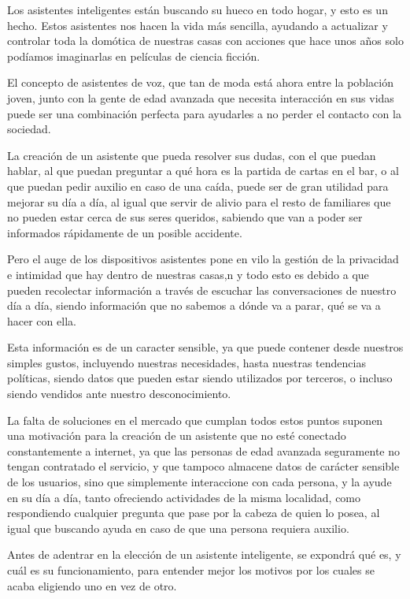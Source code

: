 Los asistentes inteligentes están buscando su hueco en todo hogar, y esto es un hecho.
Estos asistentes nos hacen la vida más sencilla, ayudando a actualizar y controlar toda la domótica de nuestras casas con acciones que hace unos años solo podíamos imaginarlas en películas de ciencia ficción.

El concepto de asistentes de voz, que tan de moda está ahora entre la población joven, junto con la gente de edad avanzada que necesita interacción en sus vidas puede ser una combinación perfecta para ayudarles a no perder el contacto con la sociedad.

La creación de un asistente que pueda resolver sus dudas, con el que puedan hablar, al que puedan preguntar a qué hora es la partida de cartas en el bar, o al que puedan pedir auxilio en caso de una caída, puede ser de gran utilidad para mejorar su día a día, al igual que servir de alivio para el resto de familiares que no pueden estar cerca de sus seres queridos, sabiendo que van a poder ser informados rápidamente de un posible accidente.

Pero el auge de los dispositivos asistentes pone en vilo la gestión de la privacidad e intimidad que hay dentro de nuestras casas,n y todo esto es debido a que pueden recolectar información a través de escuchar las conversaciones de nuestro día a día, siendo información que no sabemos a dónde va a parar, qué se va a hacer con ella.

Esta información es de un caracter sensible, ya que puede contener desde nuestros simples gustos, incluyendo nuestras necesidades, hasta nuestras tendencias políticas, siendo datos que pueden estar siendo utilizados por terceros, o incluso siendo vendidos ante nuestro desconocimiento.

La falta de soluciones en el mercado que cumplan todos estos puntos suponen una motivación para la creación de un asistente que no esté conectado constantemente a internet, ya que las personas de edad avanzada seguramente no tengan contratado el servicio, y que tampoco almacene datos de carácter sensible de los usuarios, sino que simplemente interaccione con cada persona, y la ayude en su día a día, tanto ofreciendo actividades de la misma localidad, como respondiendo cualquier pregunta que pase por la cabeza de quien lo posea, al igual que buscando ayuda en caso de que una persona requiera auxilio.

Antes de adentrar en la elección de un asistente inteligente, se expondrá qué es, y cuál es su funcionamiento, para entender mejor los motivos por los cuales se acaba eligiendo uno en vez de otro.

